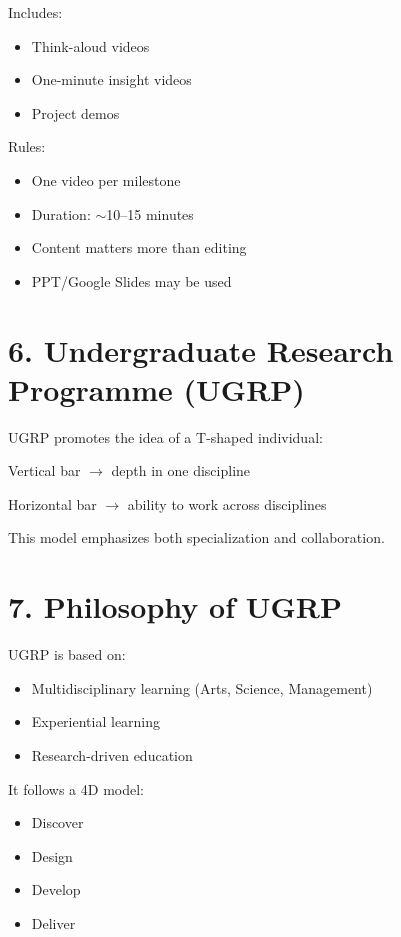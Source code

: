 \documentclass[11pt]{article}
\begin{document}
Includes:

\begin{itemize}
\item Think-aloud videos
\item One-minute insight videos
\item Project demos
\end{itemize}

Rules:

\begin{itemize}
\item One video per milestone
\item Duration: $\sim$10–15 minutes
\item Content matters more than editing
\item PPT/Google Slides may be used
\end{itemize}

\section*{6. Undergraduate Research Programme (UGRP)}

UGRP promotes the idea of a T-shaped individual:

Vertical bar $\rightarrow$ depth in one discipline

Horizontal bar $\rightarrow$ ability to work across disciplines

This model emphasizes both specialization and collaboration.

\section*{7. Philosophy of UGRP}

UGRP is based on:

\begin{itemize}
\item Multidisciplinary learning (Arts, Science, Management)
\item Experiential learning
\item Research-driven education
\end{itemize}

It follows a 4D model:

\begin{itemize}
\item Discover
\item Design
\item Develop
\item Deliver
\end{itemize}
\end{document}
